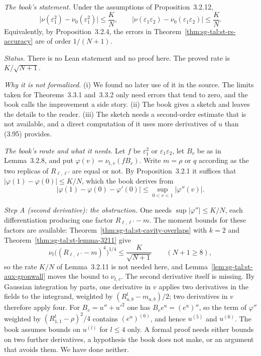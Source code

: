 \begin{remark}\label{rem:sg-tal:st-theorem-3214}
\emph{The book's statement.} Under the assumptions of Proposition~3.2.12,
\[
\bigl|\nu(\varepsilon_1^2)-\nu_0(\varepsilon_1^2)\bigr|\le\frac KN,\qquad
\bigl|\nu(\varepsilon_1\varepsilon_2)-\nu_0(\varepsilon_1\varepsilon_2)\bigr|\le\frac KN .
\]
Equivalently, by Proposition~3.2.4, the errors in Theorem~\ref{thm:sg-tal:st-rs-accuracy} are of order $1/(N+1)$.

\emph{Status.} There is no Lean statement and no proof here. The proved rate is $K/\sqrt{N+1}$.

\emph{Why it is not formalized.}
(i) We found no later use of it in the source. The limits taken for Theorems~3.3.1 and~3.3.2 only need errors that
tend to zero, and the book calls the improvement a side story.
(ii) The book gives a sketch and leaves the details to the reader.
(iii) The sketch needs a second-order estimate that is not available, and a direct computation of it uses more
derivatives of $u$ than (3.95) provides.

\emph{The book's route and what it needs.} Let $f$ be $\varepsilon_1^2$ or $\varepsilon_1\varepsilon_2$, let $B_v$ be
as in Lemma~3.2.8, and put $\varphi(v)=\nu_{t,v}(fB_v)$. Write $m=\rho$ or $q$ according as the two replicas of
$R_{\ell,\ell'}$ are equal or not. By Proposition~3.2.1 it suffices that
$|\varphi(1)-\varphi(0)|\le K/N$, which the book derives from
\[
\bigl|\varphi(1)-\varphi(0)-\varphi'(0)\bigr|\le\sup_{0<v<1}|\varphi''(v)| .
\]

\emph{Step A (second derivative): the obstruction.} One needs $\sup|\varphi''|\le K/N$, each differentiation
producing one factor $R_{\ell,\ell'}-m$. The moment bounds for these factors are available:
Theorem~\ref{thm:sg-tal:st-cavity-overlaps} with $k=2$ and Theorem~\ref{thm:sg-tal:st-lemma-3211} give
\[
\nu_t\bigl((R_{\ell,\ell'}-m)^4\bigr)^{1/4}\le\frac K{\sqrt{N+1}}\qquad(N+1\ge8),
\]
so the rate $K/N$ of Lemma~3.2.11 is not needed here, and Lemma~\ref{lem:sg-tal:st-aux-gronwall} moves the bound
to $\nu_{t,v}$. The second derivative itself is missing. By Gaussian integration by parts, one derivative in $v$
applies two derivatives in the fields to the integrand, weighted by $(R^t_{a,b}-m_{a,b})/2$; two derivatives in
$v$ therefore apply four. For $B_v=u''+u'^2$ one has $B_ve^{u}=(e^{u})''$, so the term of $\varphi''$ weighted by
$(R^t_{1,1}-\rho)^2/4$ contains $(e^{u})^{(6)}$, and hence $u^{(5)}$ and $u^{(6)}$. The book assumes bounds on
$u^{(l)}$ for $l\le4$ only. A formal proof needs either bounds on two further derivatives, a hypothesis the book
does not make, or an argument that avoids them. We have done neither.


\end{remark}
